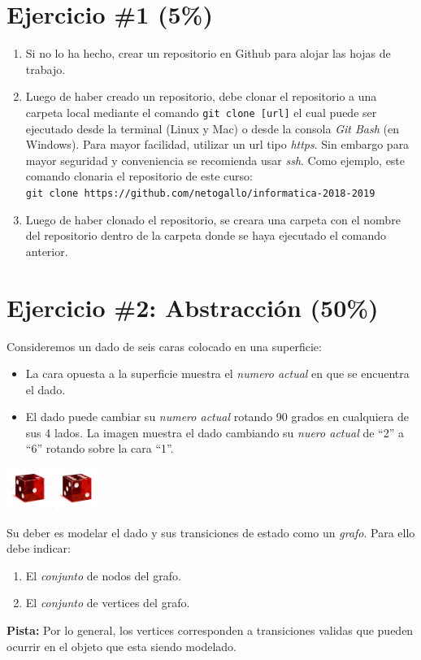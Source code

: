 \documentclass{article}
\begin{document}
\section*{Ejercicio \#1 (5\%)}
\begin{enumerate}
        \item{
                Si no lo ha hecho, crear un repositorio en Github para alojar
                las hojas de trabajo.}
        \item{
                Luego de haber creado un repositorio, debe clonar el repositorio
                a una carpeta local mediante el comando \texttt{git clone [url]} el cual
                puede ser ejecutado desde la terminal (Linux y Mac) o desde la consola
                \emph{Git Bash} (en Windows). Para mayor
                facilidad, utilizar un url tipo \emph{https}. Sin embargo para mayor
                seguridad y conveniencia se recomienda usar \emph{ssh}\cite{GithubSsh}.
                Como ejemplo, este comando clonaria el repositorio de este curso: \\
                \texttt{git clone https://github.com/netogallo/informatica-2018-2019}
        }
        \item{
                Luego de haber clonado el repositorio, se creara una carpeta
                con el nombre del repositorio dentro de la carpeta donde se
                haya ejecutado el comando anterior.
        }
\end{enumerate}

\section*{Ejercicio \#2: Abstracci\'on (50\%)}
Consideremos un dado de seis caras colocado en una superficie:
\begin{itemize}
        \item{La cara opuesta a la superficie muestra el \emph{numero actual} en que se encuentra el dado.}
        \item{El dado puede cambiar su \emph{numero actual} rotando 90 grados en cualquiera de
        sus 4 lados. La imagen muestra el dado cambiando su \emph{nuero actual} de ``2'' a ``6''
        rotando sobre la cara ``1''.}
\end{itemize}
\begin{center}
\includegraphics[width=3cm]{die.png}
\end{center}
Su deber es modelar el dado y sus transiciones de estado como un \emph{grafo}. Para ello debe
indicar:
\begin{enumerate}
        \item{El \emph{conjunto} de nodos del grafo.}
        \item{El \emph{conjunto} de vertices del grafo.}
\end{enumerate}
{\bf Pista:} Por lo general, los vertices corresponden a transiciones validas que pueden
ocurrir en el objeto que esta siendo modelado.
\end{document}
